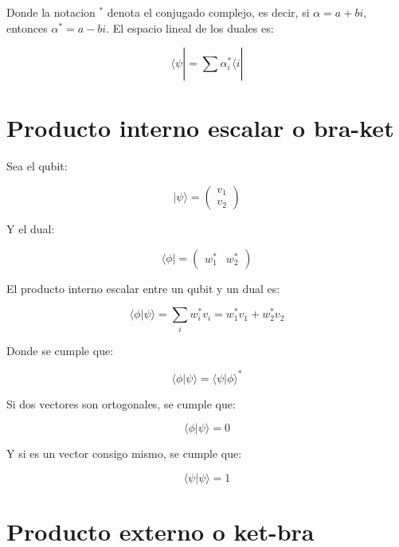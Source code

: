 \documentclass[11pt]{article}
\begin{document}
Donde la notacion $^*$ denota el conjugado complejo, es decir, si $\alpha = a + bi$, entonces $\alpha^* = a - bi$. El espacio lineal de los duales es:

\begin{equation}
    \langle \psi | = \sum_{}^{} \alpha_i^* \langle i |
\end{equation}

\section{Producto interno escalar o bra-ket}

Sea el qubit:

\begin{equation}
    |\psi\rangle = \begin{pmatrix} v_1 \\ v_2 \end{pmatrix}
\end{equation}

Y el dual:

\begin{equation}
    \langle \phi | = \begin{pmatrix} w_1^* & w_2^* \end{pmatrix}
\end{equation}

El producto interno escalar entre un qubit y un dual es:

\begin{equation}
    \langle \phi | \psi \rangle = \sum_{i} w_i^* v_i = w_1^* v_1 + w_2^* v_2
\end{equation}

Donde se cumple que:

\begin{equation}
    \langle \phi | \psi \rangle = \langle \psi | \phi \rangle^*
\end{equation}

Si dos vectores son ortogonales, se cumple que:

\begin{equation}
    \langle \phi | \psi \rangle = 0
\end{equation}

Y si es un vector consigo mismo, se cumple que:

\begin{equation}
    \langle \psi | \psi \rangle = 1
\end{equation}

\section{Producto externo o ket-bra}
\end{document}
